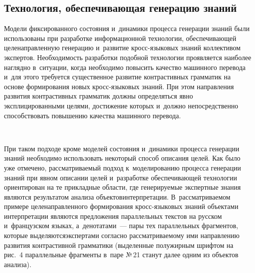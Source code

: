 {\begin{multicols}{2}
\section{Технология, обеспечивающая генерацию знаний}


      Модели фиксированного состояния и~динамики процесса генерации знаний были 
использованы при разработке информационной технологии,\linebreak
 обеспечивающей 
целенаправленную генерацию и~развитие кросс-язы\-ко\-вых знаний коллективом 
экспертов. Необходимость разработки подобной технологии проявляется наиболее 
наглядно в~ситуации, когда необходимо повысить качество машинного перевода и~для этого 
требуется существенное развитие контрастивных грамматик на основе формирования 
новых кросс-язы\-ко\-вых знаний. При этом направления развития контрастивных 
грамматик должны определяться явно эксплицированными целями, достижение которых 
и~должно непосредственно способствовать повышению качества машинного перевода. 

\begin{figure*}[b] %
\vspace*{1pt}
 \begin{center}
 \mbox{%
 \epsfxsize=165.062mm
 }
 \end{center}
 \vspace*{-9pt}
\end{figure*}


      
      При таком подходе кроме моделей состояния и~динамики процесса генерации 
знаний необходимо использовать некоторый способ описания целей. Как было уже 
отмечено, рассматрива\-емый подход к~моделированию процесса генерации знаний при 
явном описании целей и~разработке обеспечивающей технологии ориентирован на те 
прикладные области, где генерируемые экспертные знания являются результатом анализа 
объектов\linebreak интерпретации. В~рассматриваемом примере це\-ле\-на\-прав\-лен\-но\-го формирования 
кросс-язы\-ко\-вых знаний объектами интерпретации являются предложения параллельных 
текстов на рус\-ском и~французском языках, а~денотатами~--- пары тех параллельных 
фрагментов, которые выделяются\linebreak экспертами согласно рассматриваемому ими 
направлению развития контрастивной грамматики (выделенные полужирным шрифтом на 
рис.~4 параллельные фрагменты в~паре №\,21 станут далее одним из объектов анализа).


\end{multicols}}
